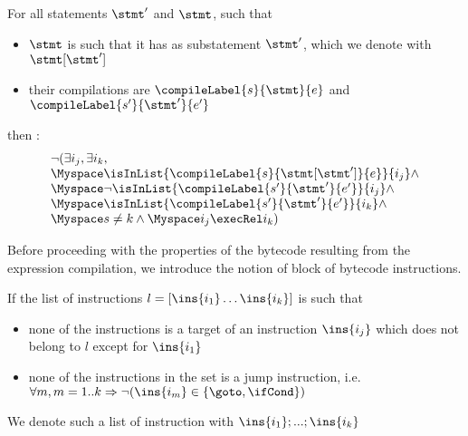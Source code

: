 \begin{compProp2}\label{compProp2}
 For all  statements $\stmt'$  and $\stmt$, such that

\begin{itemize}
    \item $\stmt$ is such that it has as substatement $\stmt'$, which we denote with 
          $\stmt[ \stmt']$ 
      \item their  compilations  are $\compileLabel{s}{\stmt}{e}$ and  $\compileLabel{s'}{\stmt'}{e'}$
\end{itemize}
then :
$$\begin{array}{l} \neg (\exists i_j, \exists i_k,  \\   
                       \Myspace \isInList{\compileLabel{s}{\stmt[\stmt']}{e} }{i_j} \wedge\\
		       \Myspace \neg \isInList{\compileLabel{s'}{\stmt'}{e'} }{i_j}   \wedge \\
		       \Myspace  \isInList{\compileLabel{s'}{\stmt'}{e'} }{i_k} \wedge \\
		       \Myspace s \neq k   \wedge 
		       \Myspace i_j \execRel i_k )


  \end{array}$$ 

\end{compProp2}





Before proceeding with the properties of the bytecode resulting from the expression compilation, we introduce the notion of block
of bytecode instructions.  


\begin{seqInstr} \label{seqInstr}
If the list of  instructions $l  = \lbrack \ins{i_1} \ldots \ins{i_k} \rbrack$ is such that 
 \begin{itemize}
              
      \item   none of the instructions is a target of an instruction $\ins{i_j}$ which does not belong to $l$ except for $\ins{i_1}$
       \item none of the instructions in the set is a jump instruction, i.e. $\forall m, m = 1..k \Rightarrow \neg( \ins{i_m} \in  \{\goto, \ifCond\} )  $ 
  
 \end{itemize}

We denote such a list of instruction with $\ins{i_1};...;\ins{i_k}$

\end{seqInstr}


